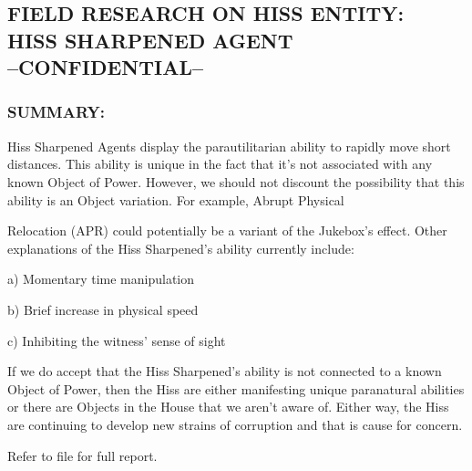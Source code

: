\subsection*{FIELD RESEARCH ON HISS ENTITY:\\
	HISS SHARPENED AGENT\\
	--CONFIDENTIAL--}
\subsubsection*{SUMMARY:}
\par Hiss Sharpened Agents display the
parautilitarian ability to rapidly move short
distances. This ability is unique in the
fact that it's not associated with any
known Object of Power. However, we
should not discount the possibility that
this ability is an Object variation. For example, Abrupt Physical
\par Relocation (APR) could potentially be a variant of the Jukebox's
effect. Other explanations of the Hiss Sharpened's ability
currently include:
\par a) Momentary time manipulation
\par b) Brief increase in physical speed
\par c) Inhibiting the witness' sense of sight
\par If we do accept that the Hiss Sharpened's ability is not connected
to a known Object of Power, then the Hiss are either manifesting
unique paranatural abilities or there are Objects in the House that
we aren't aware of. Either way, the Hiss are continuing to develop
new strains of corruption and that is cause for concern.
\par Refer to file  for full report.